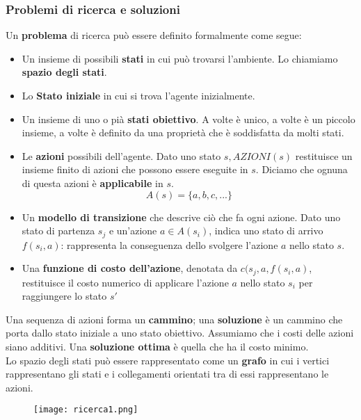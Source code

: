 \documentclass{article}
\begin{document}
\subsubsection{Problemi di ricerca e soluzioni}
Un \textbf{problema} di ricerca può essere definito formalmente come segue:
\begin{itemize}
    \item Un insieme di possibili \textbf{stati} in cui può trovarsi l'ambiente. Lo chiamiamo \textbf{spazio degli stati}.
    \item Lo \textbf{Stato iniziale} in cui si trova l'agente inizialmente.
    \item Un insieme di uno o pià \textbf{stati obiettivo}. A volte è unico, a volte è un piccolo insieme, a volte è definito da una proprietà che è soddisfatta da molti stati.
    \item Le \textbf{azioni} possibili dell'agente. Dato uno stato $s, AZIONI(s)$ restituisce un insieme finito di azioni che possono essere eseguite in $s$. Diciamo che ognuna di questa azioni è \textbf{applicabile} in $s$.
    \[ A(s)=\{a,b,c,...\}\]
    \item Un \textbf{modello di transizione} che descrive ciò che fa ogni azione. Dato uno stato di partenza $s_j$ e un'azione $a \in A(s_i)$, indica uno stato di arrivo $f(s_i,a)$: rappresenta la conseguenza dello svolgere l'azione $a$ nello stato $s$.
    \item Una \textbf{funzione di costo dell'azione}, denotata da $c(s_j,a,f(s_i,a)$, restituisce il costo numerico di applicare l'azione $a$ nello stato $s_i$ per raggiungere lo stato $s'$
    
\end{itemize}
Una sequenza di azioni forma un \textbf{cammino}; una \textbf{soluzione} è un cammino che porta dallo stato iniziale a uno stato obiettivo. Assumiamo che i costi delle azioni siano additivi. Una \textbf{soluzione ottima} è quella che ha il costo minimo. \\ Lo spazio degli stati può essere rappresentato come un \textbf{grafo} in cui i vertici rappresentano gli stati e i collegamenti orientati tra di essi rappresentano le azioni.

\begin{figure}[H]
    \centering
    \texttt{[image: ricerca1.png]}
\end{figure}
\end{document}
